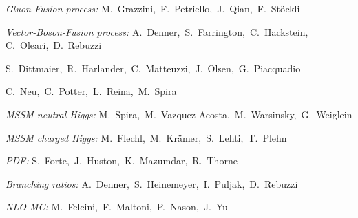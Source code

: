 


\noindent \emph{Gluon-Fusion process:}
         M.~Grazzini,\,  	 
         F.~Petriello,\,
         J.~Qian,\,  	 
         F.~St\"ockli 	    	 
\vspace{0.1cm}

\noindent \emph{Vector-Boson-Fusion process:} 	
         A.~Denner,\, 	
         S.~Farrington,\, 	
         C.~Hackstein,\,
         C.~Oleari,\,
         D.~Rebuzzi 
\vspace{0.1cm}

{} 	
         S.~Dittmaier,\, 	
         R.~Harlander,\,
         C.~Matteuzzi,\, 	
         J.~Olsen,\, 	
         G.~Piacquadio
\vspace{0.1cm}

{} 	
         C.~Neu,\, 	  	
         C.~Potter,\, 	
         L.~Reina,\, 	
         M.~Spira
\vspace{0.1cm}

\noindent\emph{MSSM neutral Higgs:} 	
         M.~Spira,\, 	
         M.~Vazquez Acosta,\, 	  	
         M.~Warsinsky,\, 	
         G.~Weiglein 
\vspace{0.1cm}

\noindent\emph{MSSM charged Higgs:} 	
         M.~Flechl,\, 	
         M.~Kr\"amer,\, 	
         S.~Lehti,\, 	  	
         T.~Plehn
\vspace{0.1cm}

\noindent\emph{PDF:} 	
         S.~Forte,\, 	
         J.~Huston,\, 	
         K.~Mazumdar,\, 	  	
         R.~Thorne
\vspace{0.1cm}

\noindent\emph{Branching ratios:} 	
         A.~Denner,\, 	
         S.~Heinemeyer,\,
         I.~Puljak,\, 	  	
         D.~Rebuzzi
\vspace{0.1cm}

\noindent\emph{NLO MC:}
         M.~Felcini,\, 	  	
         F.~Maltoni,\, 	
         P.~Nason,\,
         J.~Yu	
\vspace{0.1cm}


